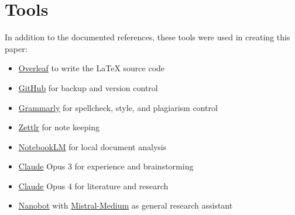 %
%

\pagebreak
\section*{Tools}

\onehalfspacing

In addition to the documented references, these tools were used in creating this paper:

\begin{itemize}
    \item \href{http://www.overleaf.com}{Overleaf} to write the LaTeX source code
    \item \href{https://github.com/chfrank-cgn}{GitHub} for backup and version control
    \item \href{https://app.grammarly.com/}{Grammarly} for spellcheck, style, and plagiarism control
    \item \href{https://www.zettlr.com/}{Zettlr} for note keeping
    \item \href{https://notebooklm.google.com}{NotebookLM} for local document analysis
    \item \href{https://www.anthropic.com/claude}{Claude} Opus 3 for experience and brainstorming
    \item \href{https://www.anthropic.com/claude}{Claude} Opus 4 for literature and research
    \item \href{https://github.com/HKUDS/nanobot}{Nanobot} with \href{https://docs.mistral.ai/models/model-cards/mistral-medium-3-5-26-04}{Mistral-Medium} as general research assistant
\end{itemize}
